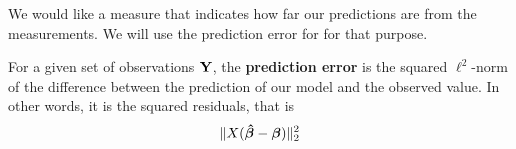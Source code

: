 We would like a measure that indicates how far our predictions are from the measurements. We will use the prediction error for for that purpose.

\begin{definition}
    For a given set of observations \(\mathbf{Y}\), the \textbf{prediction error} is the squared \(\ell^2\)-norm of the difference between the prediction of our model and the observed value. In other words, it is the squared residuals, that is
    \[
        \| X (\boldsymbol{\hat{\beta}} - \boldsymbol{\beta}) \|_2^2
    \]
\end{definition}


